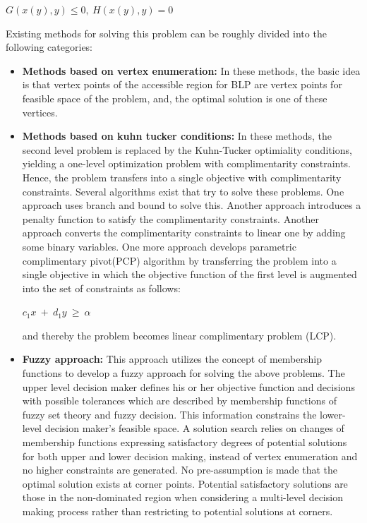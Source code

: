 \documentclass[a4paper, 12pt]{article}
\begin{document}
\begin{large}
\boldmath\begin{center}
$G\left(x\left(y\right),y\right)\leq0,\ H\left(x\left(y\right),y\right)=0$
\end{center}
\end{large}
Existing methods for solving this problem can be roughly divided into the following categories:
\begin{itemize}
\item \textbf{Methods based on vertex enumeration:} In these methods, the basic idea is that vertex points of the accessible region for BLP are vertex points for feasible space of the problem, and, the optimal solution is one of these vertices.
\item \textbf{Methods based on kuhn tucker conditions:} In these methods, the second level problem is replaced by the Kuhn-Tucker optimiality conditions, yielding a one-level optimization problem with complimentarity constraints. Hence, the problem transfers into a single objective with complimentarity constraints. Several algorithms exist that try to solve these problems. One approach uses branch and bound to solve this. Another approach introduces a penalty function to satisfy the complimentarity constraints. Another approach converts the complimentarity constraints to linear one by adding some binary variables. One more approach develops parametric complimentary pivot(PCP) algorithm by transferring the problem into a single objective in which the objective function of the first level is augmented into the set of constraints as follows:\\
\begin{center}
$c_{1}x\ +\ d_{1}y\ \geq\ \alpha$
\end{center}
and thereby the problem becomes linear complimentary problem (LCP).
\item \textbf{Fuzzy approach:} This approach utilizes the concept of membership functions to develop a fuzzy approach for solving the above problems. The upper level decision maker defines his or her objective function and decisions with possible tolerances which are described by membership functions of fuzzy set theory and fuzzy decision. This information constrains the lower-level decision maker's feasible space. A solution search relies on changes of membership functions expressing satisfactory degrees of potential solutions for both upper and lower decision making, instead of vertex enumeration and no higher constraints are generated. No pre-assumption is made that the optimal solution exists at corner points. Potential satisfactory solutions are those in the non-dominated region when considering a multi-level decision making process rather than restricting to potential solutions at corners.

\end{itemize}
\end{document}
